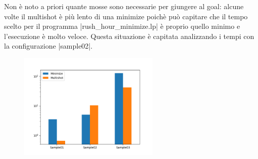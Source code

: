\documentclass[10pt, a4paper, oneside]{article}
\begin{document}





\noindent
Non è noto a priori quante mosse sono necessarie per giungere al goal: alcune volte il multishot è più lento di una minimize poichè può capitare che il tempo scelto per il programma |rush_hour_minimize.lp| è proprio quello minimo e l'esecuzione è molto veloce. Questa situazione è capitata analizzando i tempi con la configurazione |sample02|.

\begin{figure}[H]
  \centering
  \includegraphics[width=0.6\textwidth]{../images/minimize_vs_multishot.png}
\end{figure}




















\newpage
\end{document}

